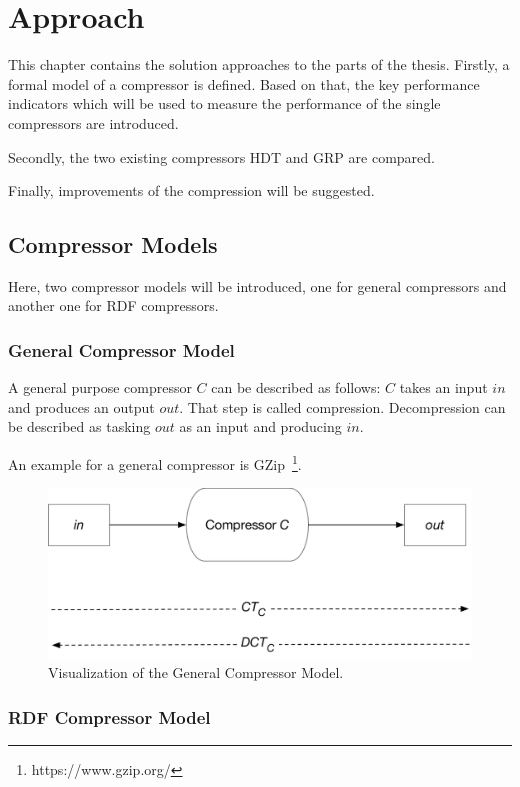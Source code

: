\chapter{Approach}\label{ch:approach}

This chapter contains the solution approaches to the parts of the thesis. Firstly, a formal model of a compressor is defined. Based on that, the key performance indicators which will be used to measure the performance of the single compressors are introduced.

Secondly, the two existing compressors HDT and GRP are compared.

Finally, improvements of the compression will be suggested.


\section{Compressor Models}

Here, two compressor models will be introduced, one for general compressors and another one for RDF compressors. 

\subsection{General Compressor Model}\label{sec:generalcompressorModel}

A general purpose compressor $C$ can be described as follows: $C$ takes an input $in$ and produces an output $out$. That step is called compression. Decompression can be described as tasking $out$ as an input and producing $in$. 

An example for a general compressor is GZip~\footnote{https://www.gzip.org/}.

\begin{figure}
	\centering
	\includegraphics[width=0.8\linewidth]{figures/approach/model_general}
	\caption{Visualization of the General Compressor Model.}
	\label{fig:generalcompressorModel}
\end{figure}

\subsection{RDF Compressor Model}\label{sec:compressorModel}

